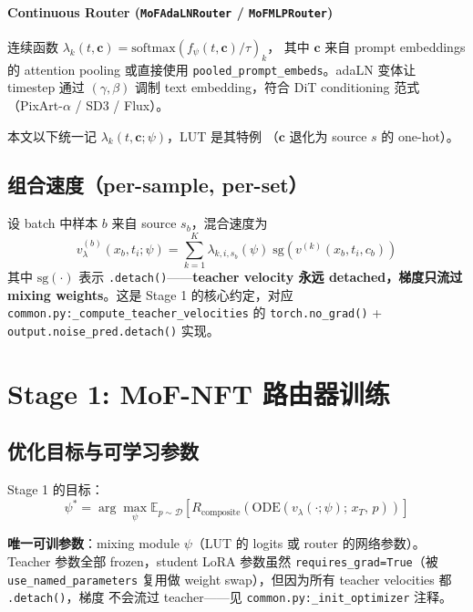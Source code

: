 \documentclass[11pt,a4paper]{article}
\newcommand{\E}{\mathbb{E}}
\newcommand{\reward}{R}
\newcommand{\softmax}{\mathrm{softmax}}
\newcommand{\sg}{\mathrm{sg}}
\theoremstyle{definition}
\begin{document}
\paragraph{Continuous Router (\texttt{MoFAdaLNRouter} / \texttt{MoFMLPRouter})}
连续函数 $\lambda_k(t, \mathbf{c}) = \softmax(f_\psi(t, \mathbf{c}) / \tau)_k$，
其中 $\mathbf{c}$ 来自 prompt embeddings 的 attention pooling 或直接使用
\texttt{pooled\_prompt\_embeds}。adaLN 变体让 timestep 通过
$(\gamma, \beta)$ 调制 text embedding，符合 DiT conditioning 范式
（PixArt-$\alpha$ / SD3 / Flux）。

本文以下统一记 $\lambda_{k}(t, \mathbf{c}; \psi)$，LUT 是其特例
（$\mathbf{c}$ 退化为 source $s$ 的 one-hot）。

\subsection{组合速度（per-sample, per-set）}

设 batch 中样本 $b$ 来自 source $s_b$，混合速度为
\begin{equation}
\boxed{
v_\lambda^{(b)}(x_b, t_i; \psi)
= \sum_{k=1}^K \lambda_{k,i,s_b}(\psi)\;\sg\!\left(v^{(k)}(x_b, t_i, c_b)\right)
}
\label{eq:per_sample_combined}
\end{equation}
其中 $\sg(\cdot)$ 表示 \texttt{.detach()}——\textbf{teacher velocity 永远
detached，梯度只流过 mixing weights}。这是 Stage 1 的核心约定，对应
\texttt{common.py:\_compute\_teacher\_velocities} 的 \texttt{torch.no\_grad()}
+ \texttt{output.noise\_pred.detach()} 实现。

\section{Stage 1: MoF-NFT 路由器训练}
\label{sec:stage1}

\subsection{优化目标与可学习参数}

Stage 1 的目标：
\begin{equation}
\psi^* = \arg\max_\psi \E_{p \sim \mathcal{D}}\!\left[
\reward_{\text{composite}}\!\left(\mathrm{ODE}(v_\lambda(\cdot;\psi);\, x_T,\, p)\right)
\right]
\label{eq:stage1_obj}
\end{equation}

\textbf{唯一可训参数}：mixing module $\psi$（LUT 的 logits 或 router 的网络参数）。
Teacher 参数全部 frozen，student LoRA 参数虽然
\texttt{requires\_grad=True}（被 \texttt{use\_named\_parameters} 复用做
weight swap），但因为所有 teacher velocities 都 \texttt{.detach()}，梯度
不会流过 teacher——见 \texttt{common.py:\_init\_optimizer} 注释。
\end{document}

